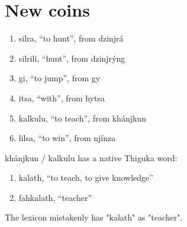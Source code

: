 \documentclass{thiguka}
\begin{document}
\newpage

\section{New coins}
\begin{enumerate}
    \item silra, ``to hunt'', from dzinjrá
    \item silrili, ``hunt'', from dzinjrýng
    \item gi, ``to jump'', from gy
    \item itsa, ``with'', from hytsa
    \item kalkulu, ``to teach'', from khánjkun
    \item lilsa, ``to win'', from njínza
\end{enumerate}

khánjkun / kalkulu has a native Thiguka word:

\begin{enumerate}
    \item kalath, ``to teach, to give knowledge''
    \item fahkalath, ``teacher''
\end{enumerate}
  
The lexicon mistakenly has "kalath" as "teacher".
\end{document}
